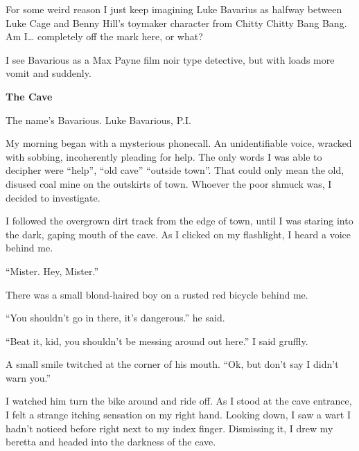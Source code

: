 For some weird reason I just keep imagining Luke Bavarius as
halfway between Luke Cage and Benny Hill's toymaker character from
Chitty Chitty Bang Bang. Am I{\ldots} completely off the mark here, or
what? 
 





I see Bavarious as a Max Payne film noir type detective, but with
loads more vomit and suddenly. 
 





{\bf The Cave}



The name's Bavarious. Luke Bavarious, P.I.



My morning began with a mysterious phonecall. An unidentifiable
voice, wracked with sobbing, incoherently pleading for help. The
only words I was able to decipher were ``help'', ``old cave'' ``outside
town''. That could only mean the old, disused coal mine on the
outskirts of town. Whoever the poor shmuck was, I decided to
investigate.



I followed the overgrown dirt track from the edge of town, until I
was staring into the dark, gaping mouth of the cave. As I clicked
on my flashlight, I heard a voice behind me.



``Mister. Hey, Mister.''



There was a small blond-haired boy on a rusted red bicycle behind
me.



``You shouldn't go in there, it's dangerous.'' he said.



``Beat it, kid, you shouldn't be messing around out here.'' I said
gruffly.



A small smile twitched at the corner of his mouth. ``Ok, but don't
say I didn't warn you.''



I watched him turn the bike around and ride off. As I stood at the
cave entrance, I felt a strange itching sensation on my right hand.
Looking down, I saw a wart I hadn't noticed before right next to my
index finger. Dismissing it, I drew my beretta and headed into the
darkness of the cave.





